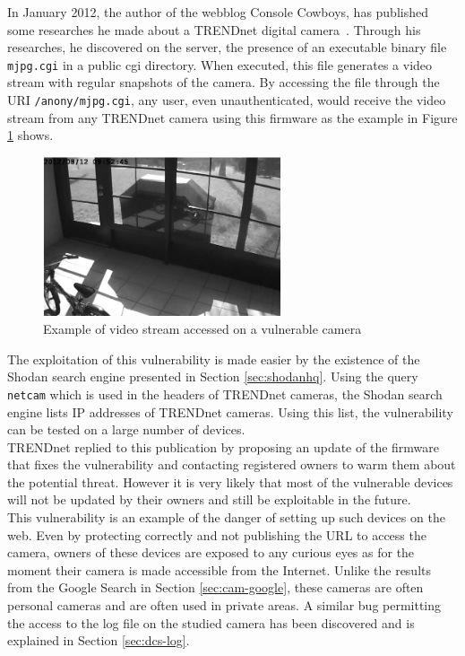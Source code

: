 In January 2012, the author of the webblog Console Cowboys, has published some researches he made about a TRENDnet digital camera~\cite{trendnet-hack}.
Through his researches, he discovered on the server, the presence of an executable binary file \texttt{mjpg.cgi} in a public cgi directory.
When executed, this file generates a video stream with regular snapshots of the camera.
By accessing the file through the URI \texttt{/anony/mjpg.cgi}, any user, even unauthenticated, would receive the video stream from any TRENDnet camera using this firmware as the example in Figure \ref{fig:trendnet-hack} shows.\\

\begin{figure}[h]
  \centering
  \includegraphics[width=7cm]{images/trendnet-hack2.png}
  \caption{Example of video stream accessed on a vulnerable camera}
  \label{fig:trendnet-hack}
\end{figure}

The exploitation of this vulnerability is made easier by the existence of the Shodan search engine presented in Section \ref{sec:shodanhq}.
Using the query \texttt{netcam} which is used in the headers of TRENDnet cameras, the Shodan search engine lists IP addresses of TRENDnet cameras.
Using this list, the vulnerability can be tested on a large number of devices.\\

TRENDnet replied to this publication by proposing an update of the firmware that fixes the vulnerability and contacting registered owners to warm them about the potential threat.
However it is very likely that most of the vulnerable devices will not be updated by their owners and still be exploitable in the future.\\


This vulnerability is an example of the danger of setting up such devices on the web.
Even by protecting correctly and not publishing the URL to access the camera, owners of these devices are exposed to any curious eyes as for the moment their camera is made accessible from the Internet.
Unlike the results from the Google Search in Section \ref{sec:cam-google}, these cameras are often personal cameras and are often used in private areas.
A similar bug permitting the access to the log file on the studied camera has been discovered and is explained in Section \ref{sec:dcs-log}.